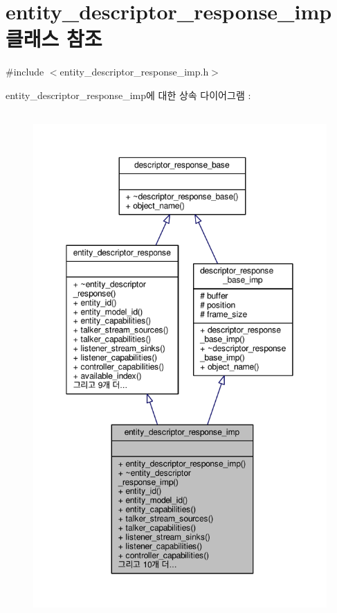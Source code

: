 \hypertarget{classavdecc__lib_1_1entity__descriptor__response__imp}{}\section{entity\+\_\+descriptor\+\_\+response\+\_\+imp 클래스 참조}
\label{classavdecc__lib_1_1entity__descriptor__response__imp}


{\ttfamily \#include $<$entity\+\_\+descriptor\+\_\+response\+\_\+imp.\+h$>$}



entity\+\_\+descriptor\+\_\+response\+\_\+imp에 대한 상속 다이어그램 \+: 
\nopagebreak
\begin{figure}[H]
\begin{center}
\leavevmode
\includegraphics[height=550pt]{classavdecc__lib_1_1entity__descriptor__response__imp__inherit__graph}
\end{center}
\end{figure}


